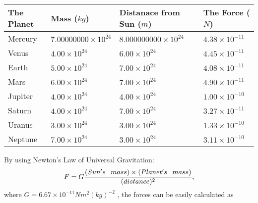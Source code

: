 \documentclass[12pt]{article}
\begin{document}
\vspace{0.2in}
 
 
\begin{tabular}{|l|l|l|l|}
\hline
The Planet & Mass ($kg$) & Distanace from Sun ($m$) & The Force ($N$)\\
\hline
Mercury  &
           $ %
7.00000000 \times 10^{24} $   &
             $ %
8.000000000 \times 10^{24} $    & $ %
4.38 \times 10^{-11} $
\\  \hline
Venus    &
           $  %
4.00 \times 10^{24}  $     &
             $ %
6.00 \times 10^{24} $    & $ %
4.45 \times 10^{-11} $
\\  \hline
Earth    &
           $  %
5.00 \times 10^{24}  $     &
             $ %
7.00 \times 10^{24} $    & $ %
4.08 \times 10^{-11} $
\\   \hline
Mars     &
           $  %
6.00 \times 10^{24} $     &
             $ %
7.00 \times 10^{24} $    & $ %
4.90 \times 10^{-11} $
\\   \hline
Jupiter  &
           $  %
4.00 \times 10^{24} $    &
             $ %
4.00 \times 10^{24} $    & $ %
1.00 \times 10^{-10} $
\\  \hline
Saturn   &
           $  %
4.00 \times 10^{24} $    &
             $ %
7.00 \times 10^{24}  $    & $ %
3.27 \times 10^{-11} $
\\  \hline
Uranus   &
           $  %
3.00 \times 10^{24} $    &
             $ %
3.00 \times 10^{24} $    & $ %
1.33 \times 10^{-10} $
\\  \hline
Neptune  &
           $  %
7.00 \times 10^{24} $    &
             $ %
3.00 \times 10^{24} $    & $ %
3.11 \times 10^{-10} $
\\  \hline
 
\end{tabular}
 
 
 
 
 
 
\noindent{}

By using Newton's Law of Universal Gravitation:
\[
F=G \frac{(Sun's \hspace{0.1in} mass) \times (Planet's \hspace{0.1in} mass)} { (distance)^2},
\]
where
$ G= %
6.67 \times 10^{-11} N m^{2}(kg)^{-2}$ , the forces can be easily calculated as
 
\vspace{0.2in}
 
\end{document}
